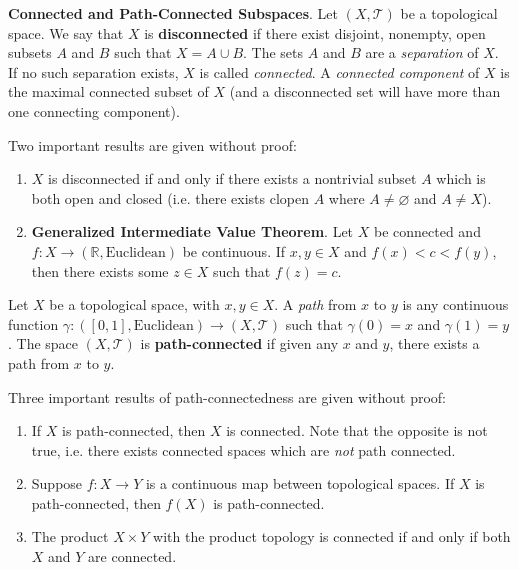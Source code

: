 \begin{shaded}
    \textbf{Connected and Path-Connected Subspaces}. Let $(X,\mathcal{T})$ be a topological space. We say that $X$ is \textbf{disconnected} if there exist disjoint, nonempty, open subsets $A$ and $B$ such that $X=A\cup B$. The sets $A$ and $B$ are a \textit{separation} of $X$. If no such separation exists, $X$ is called \textit{connected}. A \textit{connected component} of $X$ is the maximal connected subset of $X$ (and a disconnected set will have more than one connecting component).

    Two important results are given without proof:
    \vspace{-1em}
    \begin{enumerate}
        \item[-] $X$ is disconnected if and only if there exists a nontrivial subset $A$ which is both open and closed (i.e. there exists clopen $A$ where $A\neq\varnothing$ and $A\neq X$).
        \item[-] \textbf{Generalized Intermediate Value Theorem}. Let $X$ be connected and $f:X\to(\mathbb{R},\text{Euclidean})$ be continuous. If $x,y\in X$ and $f(x)<c<f(y)$, then there exists some $z\in X$ such that $f(z)=c$.
    \end{enumerate}
    \vspace{-1em}
    Let $X$ be a topological space, with $x,y\in X$. A \textit{path} from $x$ to $y$ is any continuous function $\gamma:([0,1],\text{Euclidean})\to (X,\mathcal{T})$ such that $\gamma(0)=x$ and $\gamma(1)=y$. The space $(X,\mathcal{T})$ is \textbf{path-connected} if given any $x$ and $y$, there exists a path from $x$ to $y$. 
    
    Three important results of path-connectedness are given without proof:
    \vspace{-1em}
    \begin{enumerate}
        \item[-] If $X$ is path-connected, then $X$ is connected. Note that the opposite is not true, i.e. there exists connected spaces which are \textit{not} path connected.
        \item[-] Suppose $f:X\to Y$ is a continuous map between topological spaces. If $X$ is path-connected, then $f(X)$ is path-connected.
        \item[-] The product $X\times Y$ with the product topology is connected if and only if both $X$ and $Y$ are connected.
    \end{enumerate}
\end{shaded}

